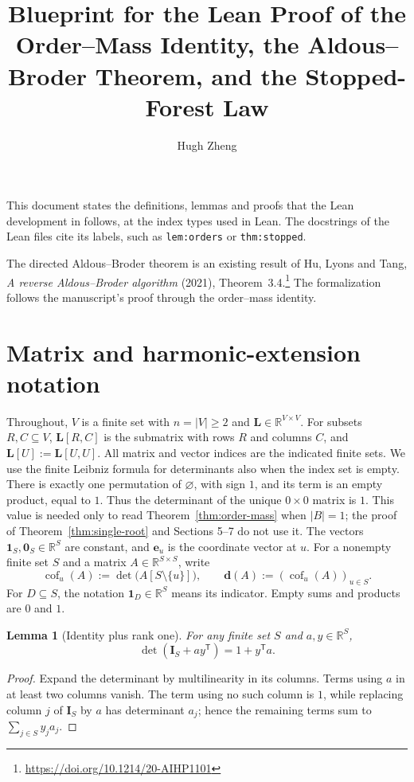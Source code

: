 \documentclass[11pt]{article}
\newtheorem{lemma}[definition]{Lemma}
\newcommand{\R}{\mathbb R}
\newcommand{\one}{\mathbf 1}
\newcommand{\zero}{\mathbf 0}
\newcommand{\Id}{\mathbf I}
\newcommand{\Lmat}{\mathbf L}
\newcommand{\cof}{\operatorname{cof}}
\begin{document}
\title{Blueprint for the Lean Proof of the Order--Mass Identity,
the Aldous--Broder Theorem, and the Stopped-Forest Law}
\author{Hugh Zheng}
\date{}
\maketitle

This document states the definitions, lemmas and proofs that the Lean
development in  follows, at the index types used in
Lean. The docstrings of the Lean files cite its labels, such as
\texttt{lem:orders} or \texttt{thm:stopped}.

The directed Aldous--Broder theorem is an existing result of Hu,
Lyons and Tang, \emph{A reverse Aldous--Broder algorithm} (2021),
Theorem~3.4.\footnote{\url{https://doi.org/10.1214/20-AIHP1101}}
The formalization follows the manuscript's proof through the
order--mass identity.

\section{Matrix and harmonic-extension notation}

Throughout, $V$ is a finite set with $n=|V|\geq2$ and
$\Lmat\in\R^{V\times V}$. For subsets $R,C\subseteq V$,
$\Lmat[R,C]$ is the submatrix with rows $R$ and columns $C$, and
$\Lmat[U]:=\Lmat[U,U]$. All matrix and vector indices are the indicated
finite sets. We use the finite Leibniz formula for determinants
also when the index set is empty. There is exactly one permutation
of $\varnothing$, with sign $1$, and its term is an empty product,
equal to $1$. Thus the determinant of the unique $0\times0$
matrix is $1$. This value is needed only to read
Theorem~\ref{thm:order-mass} when $|B|=1$; the proof of
Theorem~\ref{thm:single-root} and Sections 5--7 do not use it.
The vectors $\one_S,\zero_S\in\R^S$ are constant, and $\mathbf e_u$
is the coordinate vector at $u$. For a nonempty finite set $S$ and a
matrix $A\in\R^{S\times S}$, write
\[
\cof_u(A):=\det\bigl(A[S\setminus\{u\}]\bigr),\qquad
\mathbf d(A):=(\cof_u(A))_{u\in S}.
\]
For $D\subseteq S$, the notation $\mathbf1_D\in\R^S$ means its
indicator. Empty sums and products are $0$ and $1$.

\begin{lemma}[Identity plus rank one]\label{lem:identity-rank-one}
For any finite set $S$ and $a,y\in\R^S$,
\[
\det(\Id_S+ay^{\mathsf T})=1+y^{\mathsf T}a.
\]
\end{lemma}
\begin{proof}
Expand the determinant by multilinearity in its columns. Terms
using $a$ in at least two columns vanish. The term using no such
column is $1$, while replacing column $j$ of $\Id_S$ by $a$
has determinant $a_j$; hence the remaining terms sum to
$\sum_{j\in S}y_ja_j$.
\end{proof}
\end{document}

